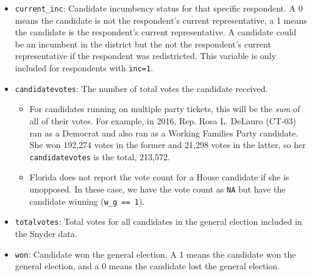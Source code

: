 \documentclass[12pt]{article}
\begin{document}
\begin{itemize}[leftmargin=*]
    \begin{tabularx}{\linewidth}{CC}
    Respondents & Candidates\\
     & 
    
    \end{tabularx}

\item \texttt{current\_inc}: Candidate incumbency status for that specific respondent. A 0 means the candidate is not the respondent's current representative, a 1 means the candidate is the respondent's current representative. A candidate could be an incumbent in the district but the not the respondent's current representative if the respondent was redistricted. This variable is only included for respondents with \texttt{inc=1}.

			
			
\item \texttt{candidatevotes}: The number of total votes the candidate received. 
\begin{itemize}
\item For candidates running on multiple party tickets, this will be the \emph{sum} of all of their votes.  For example, in 2016, Rep. Rosa L. DeLauro (CT-03) ran as a Democrat and also ran as a Working Families Party candidate. She won 192,274 votes in the former and 21,298 votes in the latter, so her \texttt{candidatevotes} is the total, 213,572.
\item  Florida does not report the vote count for a House candidate if she is unopposed. In these case, we have the vote count as \texttt{NA} but have the candidate winning (\texttt{w\_g == 1}).
\end{itemize}
				

\item \texttt{totalvotes}: Total votes for all candidates in the general election included in the Snyder data. 

\item \texttt{won}: Candidate won the general election. A 1 means the candidate won the general election, and a 0 means the candidate lost the general election. 


\end{itemize}
\end{document}
